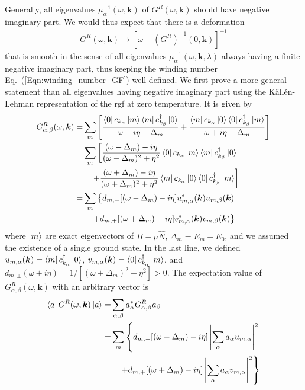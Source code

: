 \documentclass[english]{scrartcl}
\newcommand{\eq}[1]{Eq.~(\ref{#1})}
\begin{document}
Generally, all eigenvalues $\mu_\alpha^{-1}(\omega, \bm k)$ of $G^R(\omega, \bm k)$ should have negative imaginary part. We would thus expect that there is a deformation
\begin{align*}
G^R(\omega, \bm k) \to [\omega + (G^R)^{-1}(0, \bm k)]^{-1}
\end{align*}
that is smooth in the sense of all eigenvalues $\mu_\alpha^{-1}(\omega, \bm k, \lambda)$ always having a finite negative imaginary part, thus keeping the winding number \eq{Eqn:winding_number_GF} well-defined. We first prove a more general statement than all eigenvalues having negative imaginary part using the Käll\'en-Lehman representation of the \gls{rgf} at zero temperature. It is given by
\begin{align*}
G^R_{\alpha, \beta} (\omega, \bm k) =& \sum_{m} \left[\frac{\bra{0} c_{k_\alpha} \ket{m}\bra{m} c_{k_\beta}^\dagger \ket{0}}{\omega +i\eta - \Delta_m} + \frac{\bra{m} c_{k_\alpha} \ket{0}\bra{0} c_{k_\beta}^\dagger \ket{m}}{\omega + i\eta + \Delta_m}\right] \\
=& \sum_{m} \left[\frac{(\omega - \Delta_m) - i \eta}{(\omega - \Delta_m)^2 + \eta^2} \bra{0} c_{k_\alpha} \ket{m}\bra{m} c_{k_\beta}^\dagger \ket{0} \right . \\
& \quad \left. +\frac{(\omega + \Delta_m) - i \eta}{(\omega + \Delta_m)^2 + \eta^2}  \bra{m} c_{k_\alpha} \ket{0}\bra{0} c_{k_\beta}^\dagger \ket{m}\right] \\
=& \sum_{m} \left \{d_{m, -}[(\omega - \Delta_m) - i \eta] u_{m, \alpha}^* (\bm k) u_{m, \beta} (\bm k) \right . \\
& \quad \left. + d_{m, +}[(\omega + \Delta_m) - i \eta]  v_{m, \alpha}^* (\bm k) v_{m, \beta} (\bm k)  \right \} 
\end{align*}
where $\ket{m}$ are exact eigenvectors of $H - \mu \hat N$, $\Delta_m = E_m - E_0$, and we assumed the existence of a single ground state. 
In the last line, we defined $u_{m, \alpha}(\bm k) = \bra{m} c_{k_\alpha}^\dagger \ket{0}$, $v_{m, \alpha}(\bm k) = \bra{0} c_{k_\alpha}^\dagger \ket{m}$, and  $d_{m, \pm}(\omega + i \eta) = 1 / [(\omega \pm \Delta_m)^2 + \eta^2] > 0$. The expectation value of $G^R_{\alpha, \beta} (\omega, \bm k) $ with an arbitrary vector is 
\begin{align*}
\bra{a} G^R(\omega, \bm k)  \ket{a} =& \sum_{\alpha, \beta} a_\alpha^* G^R_{\alpha, \beta} a_\beta \\
=& \sum_{m} \left \{d_{m, -}[(\omega - \Delta_m) - i \eta] \left |\sum_\alpha a_\alpha u_{m,\alpha}\right |^2 \right . \\
& \quad \left. + d_{m, +}[(\omega + \Delta_m) - i \eta]  \left |\sum_\alpha a_\alpha v_{m,\alpha}\right |^2  \right \}
\end{align*}
\end{document}
